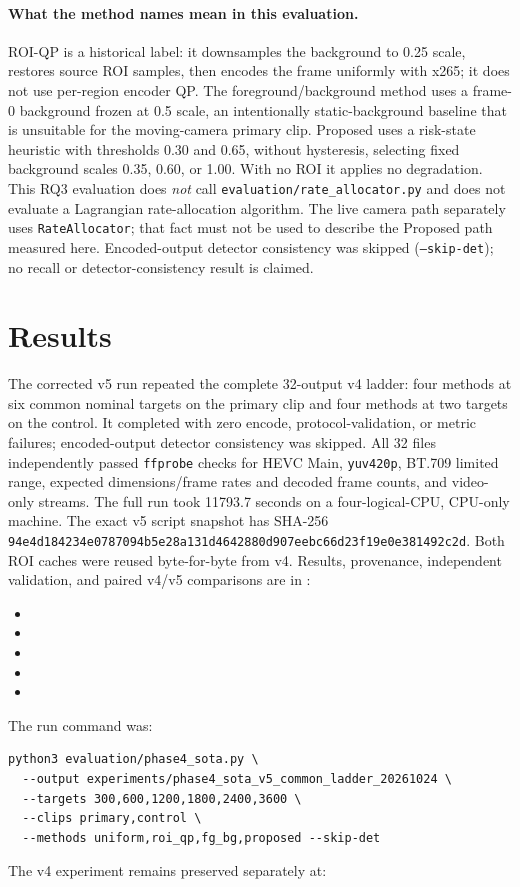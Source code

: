 \documentclass[11pt,a4paper]{article}
\begin{document}
\paragraph{What the method names mean in this evaluation.}
ROI-QP is a historical label: it downsamples the background to 0.25 scale,
restores source ROI samples, then encodes the frame uniformly with x265; it
does not use per-region encoder QP. The foreground/background method uses a
frame-0 background frozen at 0.5 scale, an intentionally static-background
baseline that is unsuitable for the moving-camera primary clip. Proposed
uses a risk-state heuristic with thresholds 0.30 and 0.65, without
hysteresis, selecting fixed background scales 0.35, 0.60, or 1.00. With no
ROI it applies no degradation. This RQ3 evaluation does \emph{not} call
\texttt{evaluation/rate\_allocator.py} and does not evaluate a Lagrangian
rate-allocation algorithm. The live camera path separately uses
\texttt{RateAllocator}; that fact must not be used to describe the Proposed
path measured here. Encoded-output detector consistency was skipped
(\texttt{--skip-det}); no recall or detector-consistency result is claimed.

\section{Results}

The corrected v5 run repeated the complete 32-output v4 ladder: four methods
at six common nominal targets on the primary clip and four methods at two
targets on the control. It completed with zero encode, protocol-validation,
or metric failures; encoded-output detector consistency was skipped. All
32 files independently passed \texttt{ffprobe} checks for HEVC Main,
\texttt{yuv420p}, BT.709 limited range, expected dimensions/frame rates and
decoded frame counts, and video-only streams. The full run took 11793.7
seconds on a four-logical-CPU, CPU-only machine. The exact v5 script snapshot
has SHA-256
\texttt{94e4d184234e0787094b5e28a131d4642880d907eebc66d23f19e0e381492c2d}.
Both ROI caches were reused byte-for-byte from v4. Results, provenance,
independent validation, and paired v4/v5 comparisons are in
:
\begin{itemize}
\item {}
\item {}
\item {}
\item {}
\item {}
\end{itemize}
The run command was:
\begin{verbatim}
python3 evaluation/phase4_sota.py \
  --output experiments/phase4_sota_v5_common_ladder_20261024 \
  --targets 300,600,1200,1800,2400,3600 \
  --clips primary,control \
  --methods uniform,roi_qp,fg_bg,proposed --skip-det
\end{verbatim}
The v4 experiment remains preserved separately at:
\end{document}
